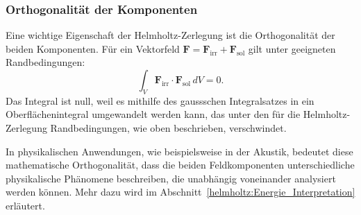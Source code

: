 \subsubsection{Orthogonalität der Komponenten}

Eine wichtige Eigenschaft der Helmholtz-Zerlegung ist die Orthogonalität
der beiden Komponenten.
%
Für ein Vektorfeld
$\boldsymbol{F} = \boldsymbol{F}_{\text{irr}} + \boldsymbol{F}_{\text{sol}}$
gilt unter geeigneten Randbedingungen:
\begin{equation*}
\int_V \boldsymbol{F}_{\text{irr}} \cdot \boldsymbol{F}_{\text{sol}} \, dV = 0.
\end{equation*}
%
%
Das Integral ist null, weil es mithilfe des gaussschen Integralsatzes
in ein Oberflächenintegral umgewandelt werden kann, das unter den
für die Helmholtz-Zerlegung Randbedingungen, wie oben
beschrieben, verschwindet.
 
In physikalischen Anwendungen, wie beispielsweise in der Akustik,
bedeutet diese mathematische Orthogonalität, dass die beiden
Feldkomponenten unterschiedliche physikalische Phänomene beschreiben,
die unabhängig voneinander analysiert werden können.
Mehr dazu wird im Abschnitt~\ref{helmholtz:Energie_Interpretation}
erläutert.


